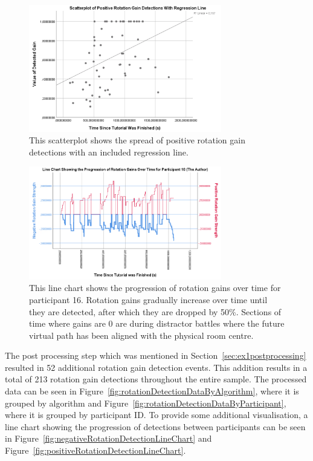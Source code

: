 \begin{figure}[tbph]
    \centering
    \includegraphics[width=0.75\textwidth]{figures/graphs/PosRotDetectionsRegLine.png}
    \caption[Scatterplot For Positive  Rotation Gain Detections Including Regression Line]{This scatterplot shows the spread of positive rotation gain detections with an included regression line.}
    \label{fig:posRotRegLine}
\end{figure}

\begin{figure}[tbph]
    \centering
    \includegraphics[width=0.75\textwidth]{figures/graphs/rotationGainProgressionAuthor.png}
    \caption[Line Chart Showing the Progression of Rotation Gains for Participant 16]{This line chart shows the progression of rotation gains over time for participant 16. Rotation gains gradually increase over time until they are detected, after which they are dropped by 50\%. Sections of time where gains are 0 are during distractor battles where the future virtual path has been aligned with the physical room centre.}
    \label{fig:authorRotationProgression}
\end{figure}

The post processing step which was mentioned in Section~\ref{sec:ex1postprocessing} resulted in 52 additional rotation gain detection events. This addition results in a total of 213 rotation gain detections throughout the entire sample. The processed data can be seen in Figure~\ref{fig:rotationDetectionDataByAlgorithm}, where it is grouped by algorithm and Figure~\ref{fig:rotationDetectionDataByParticipant}, where it is grouped by participant ID. To provide some additional visualisation, a line chart showing the progression of detections between participants can be seen in Figure~\ref{fig:negativeRotationDetectionLineChart} and Figure~\ref{fig:positiveRotationDetectionLineChart}.

